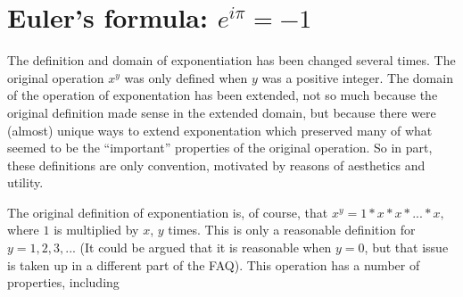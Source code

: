 \section{Euler's formula: $e^{i \pi} = - 1 $}

The definition and domain of exponentiation has been changed several
times.  The original operation $x^y$ was only defined when $y$ was a
positive integer.  The domain of the operation of exponentation has been
extended, not so much because the original definition made sense in the
extended domain, but because there were (almost) unique ways to extend
exponentation which preserved many of what seemed to be the
``important'' properties of the original operation.  So in part, these
definitions are only convention, motivated by reasons of aesthetics and
utility.

The original definition of exponentiation is, of course, that $x^y = 1 *
x * x * ... * x,$ where $1$ is multiplied by $x$, $y$ times.  This is
only a reasonable definition for $y=1, 2, 3, ...$ (It could be argued
that it is reasonable when $y=0$, but that issue is taken up in a
different part of the FAQ).  This operation has a number of properties,
including

